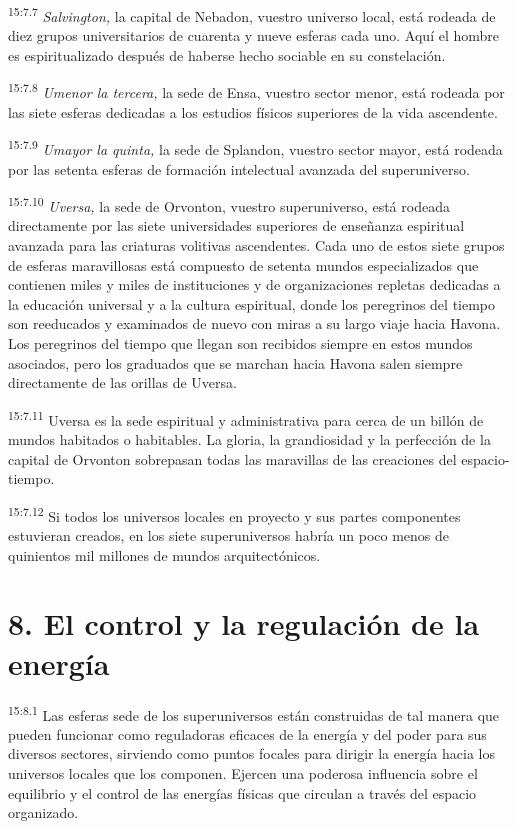 \par
\textsuperscript{15:7.7} \textit{Salvington,} la capital de Nebadon, vuestro universo local, está rodeada de diez grupos universitarios de cuarenta y nueve esferas cada uno. Aquí el hombre es espiritualizado después de haberse hecho sociable en su constelación.

\par
\textsuperscript{15:7.8} \textit{Umenor la tercera,} la sede de Ensa, vuestro sector menor, está rodeada por las siete esferas dedicadas a los estudios físicos superiores de la vida ascendente.

\par
\textsuperscript{15:7.9} \textit{Umayor la quinta,} la sede de Splandon, vuestro sector mayor, está rodeada por las setenta esferas de formación intelectual avanzada del superuniverso.

\par
\textsuperscript{15:7.10} \textit{Uversa,} la sede de Orvonton, vuestro superuniverso, está rodeada directamente por las siete universidades superiores de enseñanza espiritual avanzada para las criaturas volitivas ascendentes. Cada uno de estos siete grupos de esferas maravillosas está compuesto de setenta mundos especializados que contienen miles y miles de instituciones y de organizaciones repletas dedicadas a la educación universal y a la cultura espiritual, donde los peregrinos del tiempo son reeducados y examinados de nuevo con miras a su largo viaje hacia Havona. Los peregrinos del tiempo que llegan son recibidos siempre en estos mundos asociados, pero los graduados que se marchan hacia Havona salen siempre directamente de las orillas de Uversa.

\par
\textsuperscript{15:7.11} Uversa es la sede espiritual y administrativa para cerca de un billón de mundos habitados o habitables. La gloria, la grandiosidad y la perfección de la capital de Orvonton sobrepasan todas las maravillas de las creaciones del espacio-tiempo.

\par
\textsuperscript{15:7.12} Si todos los universos locales en proyecto y sus partes componentes estuvieran creados, en los siete superuniversos habría un poco menos de quinientos mil millones de mundos arquitectónicos.

\section*{8. El control y la regulación de la energía}
\par
\textsuperscript{15:8.1} Las esferas sede de los superuniversos están construidas de tal manera que pueden funcionar como reguladoras eficaces de la energía y del poder para sus diversos sectores, sirviendo como puntos focales para dirigir la energía hacia los universos locales que los componen. Ejercen una poderosa influencia sobre el equilibrio y el control de las energías físicas que circulan a través del espacio organizado.

